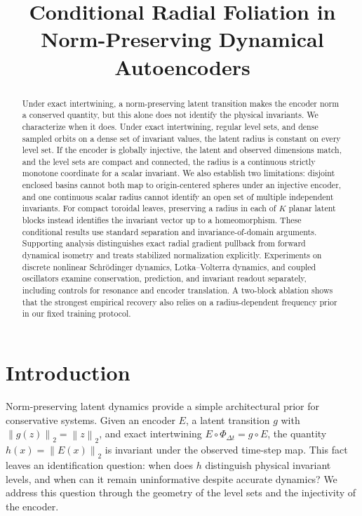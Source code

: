 \documentclass[10pt]{article}
\title{Conditional Radial Foliation in Norm-Preserving Dynamical Autoencoders}
\theoremstyle{definition}
\theoremstyle{remark}
\newcommand{\norm}[1]{\left\lVert #1 \right\rVert}
\begin{document}
\maketitle

\begin{abstract}
Under exact intertwining, a norm-preserving latent transition makes the encoder norm a conserved quantity, but this alone does not identify the physical invariants. We characterize when it does. Under exact intertwining, regular level sets, and dense sampled orbits on a dense set of invariant values, the latent radius is constant on every level set. If the encoder is globally injective, the latent and observed dimensions match, and the level sets are compact and connected, the radius is a continuous strictly monotone coordinate for a scalar invariant. We also establish two limitations: disjoint enclosed basins cannot both map to origin-centered spheres under an injective encoder, and one continuous scalar radius cannot identify an open set of multiple independent invariants. For compact toroidal leaves, preserving a radius in each of $K$ planar latent blocks instead identifies the invariant vector up to a homeomorphism. These conditional results use standard separation and invariance-of-domain arguments. Supporting analysis distinguishes exact radial gradient pullback from forward dynamical isometry and treats stabilized normalization explicitly. Experiments on discrete nonlinear Schr\"odinger dynamics, Lotka--Volterra dynamics, and coupled oscillators examine conservation, prediction, and invariant readout separately, including controls for resonance and encoder translation. A two-block ablation shows that the strongest empirical recovery also relies on a radius-dependent frequency prior in our fixed training protocol.
\end{abstract}

\section{Introduction}
\label{sec:intro}

Norm-preserving latent dynamics provide a simple architectural prior for conservative systems. Given an encoder $E$, a latent transition $g$ with $\norm{g(z)}_2=\norm{z}_2$, and exact intertwining $E\circ\Phi_{\Delta t}=g\circ E$, the quantity $h(x)=\norm{E(x)}_2$ is invariant under the observed time-step map. This fact leaves an identification question: when does $h$ distinguish physical invariant levels, and when can it remain uninformative despite accurate dynamics? We address this question through the geometry of the level sets and the injectivity of the encoder.
\end{document}
